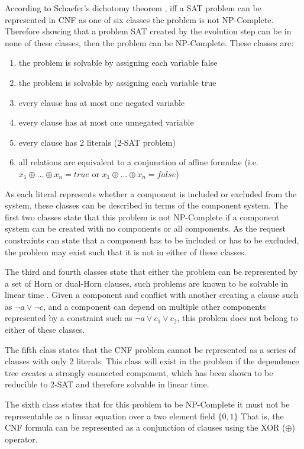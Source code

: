 According to Schaefer's dichotomy theorem \cite{Schaefer1978}, iff a SAT problem can be represented in CNF as one of six classes the problem is not NP-Complete.
Therefore showing that a problem SAT created by the evolution step can be in none of these classes, then the problem can be NP-Complete.
These classes are:
\begin{enumerate}
  \item the problem is solvable by assigning each variable false
  \item the problem is solvable by assigning each variable true
  \item every clause has at most one negated variable
  \item every clause has at most one unnegated variable
  \item every clause has 2 literals (2-SAT problem)
  \item all relations are equivalent to a conjunction of affine formulae (i.e. $x_1 \oplus \ldots \oplus x_n = true$ or $x_1 \oplus \ldots \oplus x_n = false$)
\end{enumerate} 

As each literal represents whether a component is included or excluded from the system, these classes can be described in terms of the component system.
The first two classes state that this problem is not NP-Complete if a component system can be created with no components or all components.
As the request constraints can state that a component has to be included or has to be excluded, the problem may exist such that it is not in either of these classes.  

The third and fourth classes state that either the problem can be represented by a set of Horn or dual-Horn clauses, such problems are known to be solvable in linear time \cite{dowling1984linear}.
Given a component and conflict with another creating a clause such as $\neg a \vee \neg c$, and a component can depend on multiple other components represented by a constraint such as
$\neg a \vee c_1 \vee c_2$, this problem does not belong to either of these classes.

The fifth class states that the CNF problem cannot be represented as a series of clauses with only 2 literals.
This class will exist in the problem if the dependence tree creates a strongly connected component, 
which has been shown to be reducible to 2-SAT \cite{aspvall1979linear} and therefore solvable in linear time.

The sixth class states that for this problem to be NP-Complete it must not be representable as a linear equation over a two element field $\{0,1\}$
That is, the CNF formula can be represented as a conjunction of clauses using the XOR ($\oplus$) operator.
 
